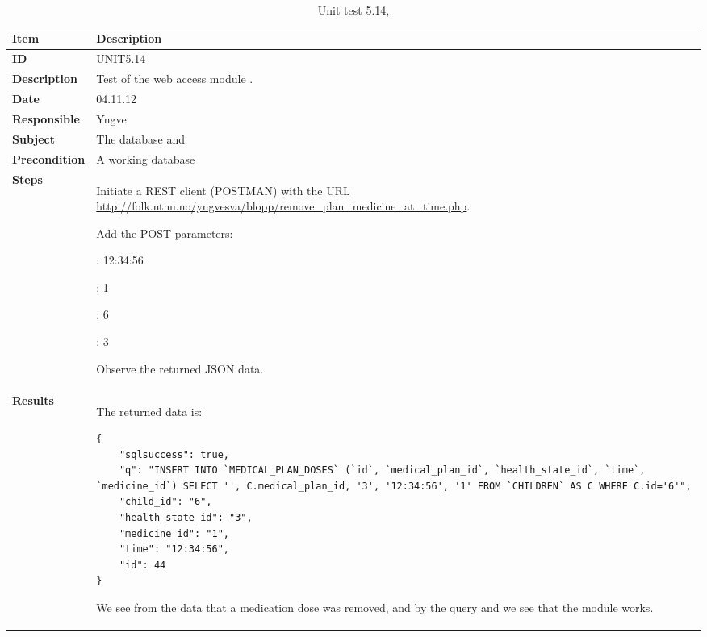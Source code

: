 \begin{table} %
	\begin{center}
		\begin{tabular}{|p{3.0cm}|p{14.0cm}|}
			\hline
			\bf{Item} & \bf{Description}\\
			\hline
			\bf{ID} & UNIT5.14\\
			\bf{Description} & Test of the web access module \code{remove\_plan\_medicine\_at\_time.php}.\\
			\bf{Date} & 04.11.12\\
			\bf{Responsible} & Yngve\\
			\bf{Subject} & The database and \code{remove\_plan\_medicine\_at\_time.php}\\
			\bf{Precondition} & A working database \\
			\bf{Steps} &
			\begin{tabulenum}
				\item Initiate a REST client (POSTMAN) with the URL \url{http://folk.ntnu.no/yngvesva/blopp/remove\_plan\_medicine\_at\_time.php}.
				\item Add the POST parameters:
					\begin{tabulitem}
					  \item \code{time}: 12:34:56
					  \item \code{medicine\_id}: 1
					  \item \code{child\_id}: 6
					  \item \code{health\_state\_id}: 3
					\end{tabulitem}
				\item Observe the returned JSON data.
			\end{tabulenum}\\
			\hline
			\bf{Results} & The returned data is:
\begin{lstlisting}[caption=Returned JSON data from \code{remove\_plan\_medicine\_at\_time.php}]
{
    "sqlsuccess": true,
    "q": "INSERT INTO `MEDICAL_PLAN_DOSES` (`id`, `medical_plan_id`, `health_state_id`, `time`, `medicine_id`) SELECT '', C.medical_plan_id, '3', '12:34:56', '1' FROM `CHILDREN` AS C WHERE C.id='6'",
    "child_id": "6",
    "health_state_id": "3",
    "medicine_id": "1",
    "time": "12:34:56",
    "id": 44
}
\end{lstlisting}
			We see from the data that a medication dose was removed, and
			by the query and \code{sqlsuccess} we see that the module works.
			\\
			\hline
		\end{tabular}
	\end{center}
	\caption{Unit test 5.14, }
	\label{tab:unit5.14}
\end{table}

